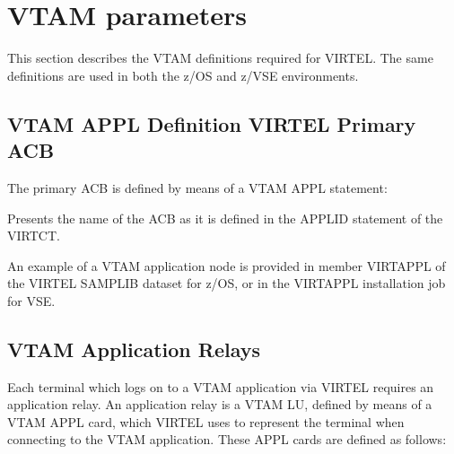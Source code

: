 \documentclass[letterpaper,10pt,english]{sphinxmanual}
\begin{document}
\section{VTAM parameters}
\label{\detokenize{Installation_Guide:vtam-parameters}}
\sphinxAtStartPar
This section describes the VTAM definitions required for VIRTEL. The same definitions are used in both the z/OS and z/VSE environments.

\ignorespaces 

\subsection{VTAM APPL Definition \sphinxhyphen{} VIRTEL Primary ACB}
\label{\detokenize{Installation_Guide:vtam-appl-definition-virtel-primary-acb}}\label{\detokenize{Installation_Guide:index-21}}
\sphinxAtStartPar
The primary ACB is defined by means of a VTAM APPL statement:

\begin{sphinxVerbatim}[commandchars=\\\{\}]
  
\end{sphinxVerbatim}

\sphinxAtStartPar
{} \sphinxhyphen{} Presents the name of the ACB as it is defined in the APPLID statement of the VIRTCT.

\sphinxAtStartPar
An example of a VTAM application node is provided in member VIRTAPPL of the VIRTEL SAMPLIB dataset for z/OS, or in the VIRTAPPL installation job for VSE.

\ignorespaces 

\subsection{VTAM Application Relays}
\label{\detokenize{Installation_Guide:vtam-application-relays}}\label{\detokenize{Installation_Guide:index-22}}
\sphinxAtStartPar
Each terminal which logs on to a VTAM application via VIRTEL requires an application relay. An application relay is a VTAM LU, defined by means of a VTAM APPL card, which VIRTEL uses to represent the terminal when connecting to the VTAM application. These APPL cards are defined as follows:
\end{document}
